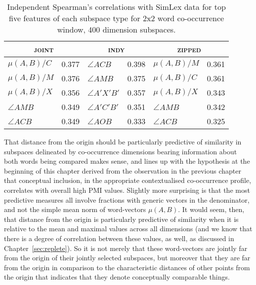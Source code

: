 \begin{table}
\centering
\begin{tabular}{lr|lr|lr}
\hline
\multicolumn{2}{c}{\textsc{joint}} & \multicolumn{2}{c}{\textsc{indy}} & \multicolumn{2}{c}{\textsc{zipped}} \\
\hline
$\mu (A,B)/C$ & 0.377 & $\angle ACB$ & 0.398 & $\mu (A,B)/M$ & 0.361 \\
$\mu (A,B)/M$ & 0.376 & $\angle AMB$ & 0.375 & $\mu (A,B)/C$ & 0.361 \\
$\mu (A,B)/X$ & 0.356 & $\angle A'X'B'$ & 0.357 & $\mu (A,B)/X$ & 0.343 \\
$\angle AMB$ & 0.349 & $\angle A'C'B'$ & 0.351 & $\angle AMB$ & 0.342 \\
$\angle ACB$ & 0.349 & $\angle AOB$ & 0.333 & $\angle ACB$ & 0.325 \\
\hline
\end{tabular}
\caption[Similarity Correlations of Individual Features]{Independent Spearman's correlations with SimLex data for top five features of each subspace type for 2x2 word co-occurrence window, 400 dimension subspaces.}
\label{tab:ind-similar}
\end{table}

That distance from the origin should be particularly predictive of similarity in subspaces delineated by co-occurrence dimensions bearing information about both words being compared makes sense, and lines up with the hypothesis at the beginning of this chapter derived from the observation in the previous chapter that conceptual inclusion, in the appropriate contextualised co-occurrence profile, correlates with overall high PMI values.  Slightly more surprising is that the most predictive measures all involve fractions with generic vectors in the denominator, and not the simple mean norm of word-vectors $\mu(A,B)$.  It would seem, then, that distance from the origin is particularly predictive of similarity when it is relative to the mean and maximal values across all dimensions (and we know that there is a degree of correlation between these values, as well, as discussed in Chapter~\ref{sec:replete}).  So it is not merely that these word-vectors are jointly far from the origin of their jointly selected subspaces, but moreover that they are far from the origin in comparison to the characteristic distances of other points from the origin that indicates that they denote conceptually comparable things.

